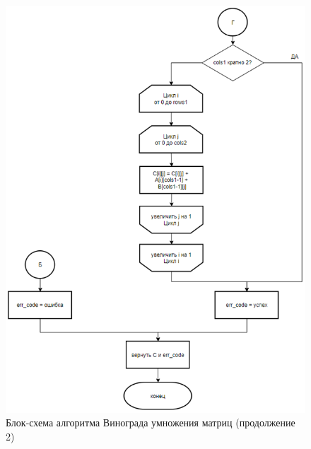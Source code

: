 \begin{figure}[H]
    \centering
    \includegraphics[width=1.02\textwidth]{img/block_2_3.png}
    \caption{Блок-схема алгоритма Винограда умножения матриц (продолжение 2)}
    \label{fig:block_2_3}
\end{figure}

